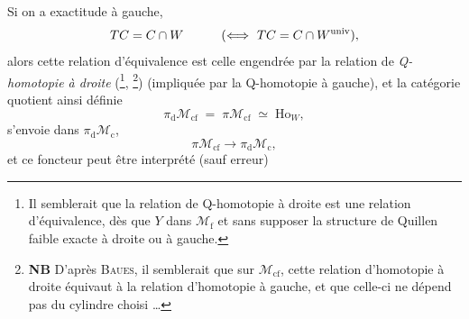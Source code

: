 Si on a exactitude à gauche,
\[
TC = C \cap W \qquad\quad (\Longleftrightarrow\ TC = C \cap W^{\mathrm{univ}}),
\]
alors cette relation d'équivalence est celle engendrée par la relation de \textit{Q-homotopie à droite} (\footnote[22]{Il semblerait que la relation de Q-homotopie à droite est une relation d'équivalence, dès que $Y$ dans $\mathcal{M}_{\mathrm{f}}$ et sans supposer la structure de Quillen faible exacte à droite ou à gauche.}, \footnote[23]{\textbf{NB} D'après \textsc{Baues}, il semblerait que sur $\mathcal{M}_{\mathrm{cf}}$, cette relation d'homotopie à droite équivaut à la relation d'homotopie à gauche, et que celle-ci ne dépend pas du cylindre choisi \ldots}) (impliquée par la Q-homotopie à gauche), et la catégorie quotient ainsi définie
\[
\pi_{\mathrm{d}}\mathcal{M}_{\mathrm{cf}} \;=\; \pi\mathcal{M}_{\mathrm{cf}} \;\simeq\; \mathrm{Ho}_W,
\]
s'envoie dans $\pi_{\mathrm{d}}\mathcal{M}_{\mathrm{c}}$,
\[
\pi\mathcal{M}_{\mathrm{cf}} \longrightarrow \pi_{\mathrm{d}}\mathcal{M}_{\mathrm{c}},
\]
et ce foncteur peut être interprété (sauf erreur)

